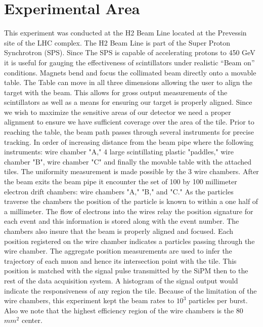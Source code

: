 \documentclass[review]{elsarticle}
\begin{document}
\section{Experimental Area}
\label{sec:experimental_area}
This experiment was conducted at the H2 Beam Line located at the Prevessin site of the LHC complex.
The H2 Beam Line is part of the Super Proton Synchrotron (SPS). 
Since The SPS is capable of accelerating protons to 450 GeV it is useful for gauging the effectiveness of scintillators under realistic “Beam on” conditions. 
Magnets bend and focus the collimated beam directly onto a movable table.
The Table can move in all three dimensions allowing the user to align the target with the beam. 
This allows for gross output measurements of the scintillators as well as a means for ensuring our target is properly aligned. 
Since we wish to maximize the sensitive areas of our detector we need a proper alignment to ensure we have sufficient coverage over the area of the tile.    
Prior to reaching the table, the beam path passes through several instruments for precise tracking. 
In order of increasing distance from the beam pipe where the following instruments: 
wire chamber "A," 4 large scintillating plastic "paddles," wire chamber "B", wire chamber "C" and finally the movable table with the attached tiles. 
The uniformity measurement is made possible by the 3 wire chambers. 
After the beam exits the beam pipe it encounter the set of 100 by 100 millimeter electron drift chambers: wire chambers "A," "B," and "C." 
As the particles traverse the chambers the position of the particle is known to within a one half of a millimeter. 
The flow of electrons into the wires relay the position signature for each event and this information is stored along with the event number. 
The chambers also insure that the beam is properly aligned and focused. 
Each position registered on the wire chamber indicates a particles passing through the wire chamber. 
The aggregate position measurements are used to infer the trajectory of each muon and hence its intersection point with the tile. 
This position is matched with the signal pulse transmitted by the SiPM then to the rest of the data acquisition system. 
A histogram of the signal output would indicate the responsiveness of any region the tile.  
Because of the limitation of the wire chambers, this experiment kept the beam rates to $10^3$ particles per burst. 
Also we note that the highest efficiency region of the wire chambers is the 80 $mm^2$ center. 

\end{document}

